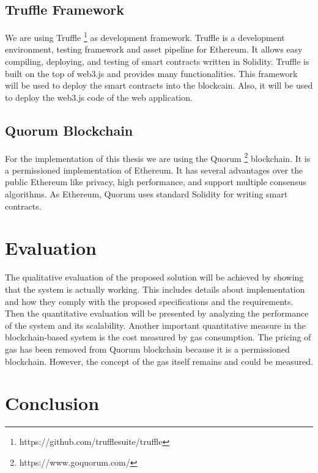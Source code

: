 \documentclass[runningheads]{llncs}
\begin{document}
\subsection{Truffle Framework}
We are using Truffle \footnote{https://github.com/trufflesuite/truffle} as development framework. Truffle is a development environment, testing framework and asset pipeline for Ethereum. It allows easy compiling, deploying, and testing of smart contracts written in Solidity. Truffle is built on the top of web3.js and provides many functionalities. This framework will be used to deploy the smart contracts into the blockcain. Also, it will be used to deploy the web3.js code of the web application. 


\subsection{Quorum Blockchain}
For the implementation of this thesis we are using the Quorum \footnote{https://www.goquorum.com/} blockchain. It is a permissioned implementation of Ethereum. It has several advantages over the public Ethereum like privacy, high performance, and support multiple consensus algorithms. As Ethereum, Quorum uses standard Solidity for writing smart contracts.

\section{Evaluation}
The qualitative evaluation of the proposed solution will be achieved by showing that the system is actually working. This includes details about implementation and how they comply with the proposed specifications and the requirements. Then the quantitative evaluation will be presented by analyzing the performance of the system and its scalability. Another important quantitative measure in the blockchain-based system is the cost measured by gas consumption. The pricing of gas has been removed from Quorum blockchain because it is a permissioned blockchain. However, the concept of the gas itself remains and could be measured. 

\section{Conclusion}

\newpage


\end{document}
